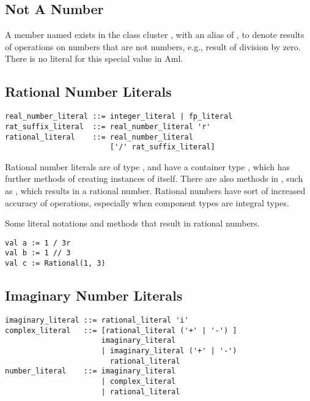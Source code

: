 \subsection{Not A Number}
\label{sec:nan}

A member named  exists in the class cluster , with an alias of , to denote results of operations on numbers that are not numbers, e.g., result of division by zero. There is no literal for this special value in Aml. 





\subsection{Rational Number Literals}
\label{sec:rationalliterals}

\syntax\begin{lstlisting}
real_number_literal ::= integer_literal | fp_literal
rat_suffix_literal  ::= real_number_literal 'r'
rational_literal    ::= real_number_literal 
                        ['/' rat_suffix_literal]
\end{lstlisting}

Rational number literals are of type , and have a container type , which has further methods of creating instances of itself. There are also methods in , such as \code{//}, which results in a rational number. Rational numbers have sort of increased accuracy of operations, especially when component types are integral types. 

\example Some literal notations and methods that result in rational numbers. 
\begin{lstlisting}
val a := 1 / 3r
val b := 1 // 3
val c := Rational(1, 3)
\end{lstlisting}





\subsection{Imaginary Number Literals}
\label{sec:imaginaryliterals}

\syntax\begin{lstlisting}
imaginary_literal ::= rational_literal 'i'
complex_literal   ::= [rational_literal ('+' | '-') ]
                      imaginary_literal
	                  | imaginary_literal ('+' | '-') 
	                    rational_literal
number_literal    ::= imaginary_literal
	                  | complex_literal
	                  | rational_literal
\end{lstlisting}

